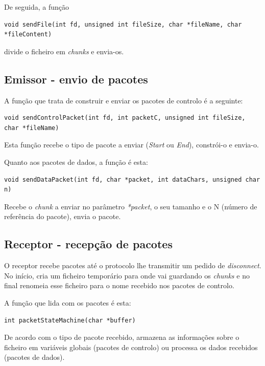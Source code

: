 \documentclass[a4paper,11pt]{article}
\begin{document}
De seguida, a função

\begin{lstlisting}
void sendFile(int fd, unsigned int fileSize, char *fileName, char *fileContent)
\end{lstlisting}

divide o ficheiro em \textit{chunks} e envia-os.

\subsection{Emissor - envio de pacotes}

A função que trata de construir e enviar os pacotes de controlo é a seguinte:

\begin{lstlisting}
void sendControlPacket(int fd, int packetC, unsigned int fileSize, char *fileName)
\end{lstlisting}

Esta função recebe o tipo de pacote a enviar (\textit{Start} ou \textit{End}), constrói-o e envia-o. 

Quanto aos pacotes de dados, a função é esta:

\begin{lstlisting}
void sendDataPacket(int fd, char *packet, int dataChars, unsigned char n)
\end{lstlisting}

Recebe o \textit{chunk} a enviar no parâmetro \textit{*packet}, o seu tamanho e o N (número de referência do pacote), envia o pacote.

\subsection{Receptor - recepção de pacotes}

O receptor recebe pacotes até o protocolo lhe transmitir um pedido de \textit{disconnect}.
No início, cria um ficheiro temporário para onde vai guardando os \textit{chunks} e no final renomeia esse ficheiro para o nome recebido nos pacotes de controlo.

A função que lida com os pacotes é esta:

\begin{lstlisting}
int packetStateMachine(char *buffer)
\end{lstlisting}

De acordo com o tipo de pacote recebido, armazena as informações sobre o ficheiro em variáveis globais (pacotes de controlo) ou processa os dados recebidos (pacotes de dados).
\end{document}

